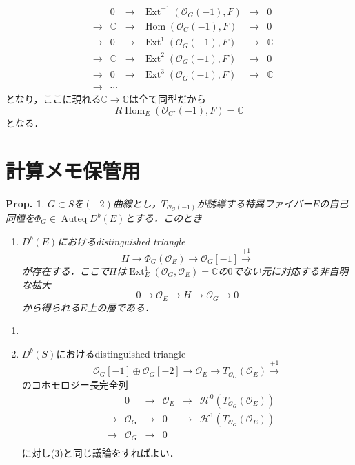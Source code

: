 \documentclass[uplatex,a4paper,11pt,dvipdfmx]{jsarticle}
\makeatletter
\theoremstyle{mystyle} %
\newtheorem{proposition}{Prop.}[section]
\renewenvironment{proof}[1][\proofname]{\par
 \pushQED{\qed}%
 \normalfont \topsep6\p@\@plus6\p@\relax
 \trivlist
 \item[\hskip\labelsep
 \itshape
 {\bf\underline{#1}}]\ignorespaces
}{%
 \popQED\endtrivlist\@endpefalse
}
\DeclareMathOperator{\Auteq}{Auteq}\DeclareMathOperator{\Coh}{Coh}
\DeclareMathOperator{\Hom}{Hom}
\DeclareMathOperator{\Ext}{Ext}
\makeatother
\begin{document}
\begin{proof}
\begin{enumerate}
\[\begin{array}{ccccccc}
				       &     & 0          & \to & \Ext^{-1}(\mathcal{O}_G(-1), F) & \to & 0          \\
				       & \to & \mathbb{C} & \to & \Hom(\mathcal{O}_G(-1), F)      & \to & 0          \\
				       & \to & 0          & \to & \Ext^1(\mathcal{O}_G(-1),F)     & \to & \mathbb{C} \\
				       & \to & \mathbb{C} & \to & \Ext^2(\mathcal{O}_G(-1),F)     & \to & 0          \\
				       & \to & 0          & \to & \Ext^3(\mathcal{O}_G(-1),F)     & \to & \mathbb{C} \\
				       & \to & \cdots     &     &                                 &
			      \end{array}
		      \]となり，ここに現れる$\mathbb{C}\to \mathbb{C}$は全て同型だから$$R\Hom_E(\mathcal{O}_{G'}(-1), F) = \mathbb{C}$$となる．
	\end{enumerate}
\end{proof}


\section{計算メモ保管用}
\begin{proposition}
	$G \subset S$を$(-2)$曲線とし，$T_{\mathcal{O}_G(-1)}$が誘導する特異ファイバー$E$の自己同値を$\Phi_G \in \Auteq D^b(E)$とする．このとき
	\begin{enumerate}
		\item $D^b(E)$におけるdistinguished triangle$$H\to \Phi_G(\mathcal{O}_E)\to \mathcal{O}_G[-1] \xrightarrow{+1} $$が存在する．ここで$H$は$\Ext^1_E(\mathcal{O}_G, \mathcal{O}_E) = \mathbb{C}$の$0$でない元に対応する非自明な拡大$$0 \to \mathcal{O}_E \to H \to \mathcal{O}_G \to 0$$から得られる$E$上の層である．
	\end{enumerate}
\end{proposition}
\begin{proof}
	\begin{enumerate}
		\item \item $D^b(S)$におけるdistinguished triangle
		      $$ \mathcal{O}_G[-1] \oplus \mathcal{O}_G[-2] \to \mathcal{O}_E \to T_{\mathcal{O}_G}(\mathcal{O}_E)\xrightarrow{+1}$$のコホモロジー長完全列
		      \[
			      \begin{array}{ccccccc}
				       &     & 0             & \to & \mathcal{O}_E & \to & \mathcal{H}^{0}(T_{\mathcal{O}_G}(\mathcal{O}_E)) \\

				       & \to & \mathcal{O}_G & \to & 0             & \to & \mathcal{H}^1(T_{\mathcal{O}_G}(\mathcal{O}_E))   \\
				       & \to & \mathcal{O}_G & \to & 0             &     &                                                   \\
			      \end{array}
		      \]
		      に対し(3)と同じ議論をすればよい．
	\end{enumerate}
\end{proof}
\end{document}
